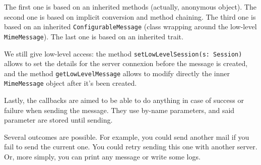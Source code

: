 \documentclass[10pt,a4paper]{article}
\begin{document}
	The first one is based on an inherited methods (actually, anonymous object). The second one is based on implicit conversion and method chaining. The third one is based on an inherited \texttt{ConfigurableMessage} (class wrapping around the low-level \texttt{MimeMessage}). The last one is based on an inherited trait.
	
	\vskip 10pt
	We still give low-level access: the method \texttt{setLowLevelSession(s: Session)} allows to set the details for the server connexion before the message is created, and the method \texttt{getLowLevelMessage} allows to modify directly the inner \texttt{MimeMessage} object after it's been created.
	
	\vskip 10pt
	Lastly, the callbacks are aimed to be able to do anything in case of success or failure when sending the message. They use by-name parameters, and said parameter are stored until sending.
	
	Several outcomes are possible. For example, you could send another mail if you fail to send the current one. You could retry sending this one with another server. Or, more simply, you can print any message or write some logs.
	
\end{document}
